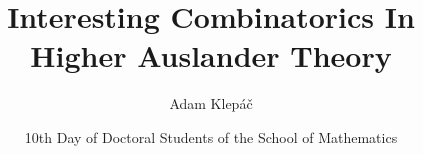 \documentclass[
	american,
	sections numbered,
	usenames,
	xcolor=dvipsnames,
	aspectratio=169,
]{beamer}
\title{Interesting Combinatorics In Higher Auslander Theory}
\author{Adam Klepáč}
\institute[CUNI]{Charles University in Prague}
\date[DDS-M]{10th Day of Doctoral Students of the School of Mathematics}
\begin{document}
\begin{frame}[plain]
	\titlepage
\end{frame}


\end{document}
